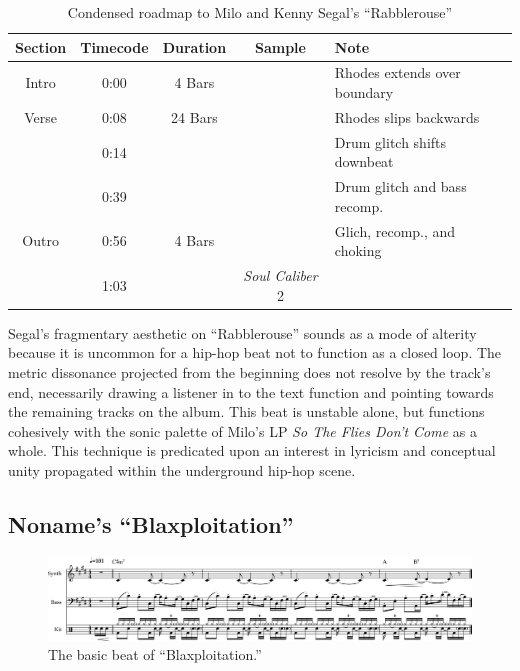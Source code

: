 \begin{table}[ht]
    \centering
        \begin{tabular}{|c|c|c|c|l|}
             \hline
            Section & Timecode & Duration & Sample                  & Note \\ \hline
            Intro   & 0:00     & 4 Bars   &                         & Rhodes extends over boundary \\ \hline
            Verse   & 0:08     & 24 Bars  &                         & Rhodes slips backwards \\ \hline
                    & 0:14     &          &                         & Drum glitch shifts downbeat \\ \hline
                    & 0:39     &          &                         & Drum glitch and bass recomp. \\ \hline
            Outro   & 0:56     & 4 Bars   &                         & Glich, recomp., and choking \\ \hline
                    & 1:03     &          & \textit{Soul Caliber} 2 & \\ \hline
        \end{tabular}
    \caption{Condensed roadmap to Milo and Kenny Segal's ``Rabblerouse''}
    \label{tab:rabblerouse}
\end{table}

\normalsize Segal's fragmentary aesthetic on ``Rabblerouse'' sounds as a mode of alterity because it is uncommon for a hip-hop beat not to function as a closed loop. The metric dissonance projected from the beginning does not resolve by the track's end, necessarily drawing a listener in to the text function and pointing towards the remaining tracks on the album. This beat is unstable alone, but functions cohesively with the sonic palette of Milo's LP \textit{So The Flies Don't Come} as a whole. This technique is predicated upon an interest in lyricism and conceptual unity propagated within the underground hip-hop scene.

\subsection*{\centering Noname's ``Blaxploitation''}

\begin{figure}[h]
    \centering
    \includegraphics[width=\textwidth]{images/figures/chp 02/Figure-02.5-Blaxploitation-BB.pdf}
    \caption{The basic beat of ``Blaxploitation.''}
    \label{fig:4.1}
\end{figure}

